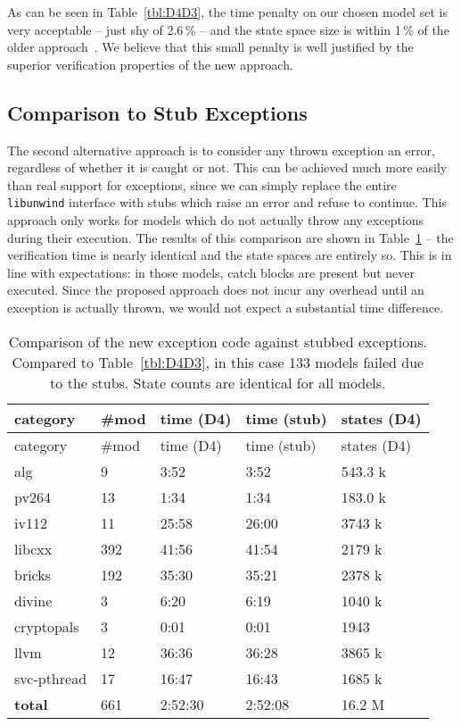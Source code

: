 As can be seen in Table~\ref{tbl:D4D3}, the time penalty on our chosen
model set is very acceptable -- just shy of 2.6\,\% -- and the state
space size is within 1\,\% of the older
approach~\cite{rockai16:model.checkin}. We believe that this small
penalty is well justified by the superior verification properties of the
new approach.

\subsection{Comparison to Stub
Exceptions}\label{comparison-to-stub-exceptions}

The second alternative approach is to consider any thrown exception an
error, regardless of whether it is caught or not. This can be achieved
much more easily than real support for exceptions, since we can simply
replace the entire \texttt{libunwind} interface with stubs which raise
an error and refuse to continue. This approach only works for models
which do not actually throw any exceptions during their execution. The
results of this comparison are shown in Table~\ref{tbl:D4stub} -- the
verification time is nearly identical and the state spaces are entirely
so. This is in line with expectations: in those models, catch blocks are
present but never executed. Since the proposed approach does not incur
any overhead until an exception is actually thrown, we would not expect
a substantial time difference.

\begin{table}[tp]
\caption{\label{tbl:D4stub}Comparison of the new exception code against
stubbed exceptions. Compared to Table~\ref{tbl:D4D3}, in this case 133
models failed due to the stubs. State counts are identical for all
models. }
\begin{tabularx}{\textwidth}{lllll}
\toprule
category & \#mod & time (D4) & time (stub) & states (D4)\tabularnewline
\midrule
\toprule
category & \#mod & time (D4) & time (stub) & states (D4)\tabularnewline
\midrule
alg & 9 & 3:52 & 3:52 & 543.3 k\tabularnewline
pv264 & 13 & 1:34 & 1:34 & 183.0 k\tabularnewline
iv112 & 11 & 25:58 & 26:00 & 3743 k\tabularnewline
libcxx & 392 & 41:56 & 41:54 & 2179 k\tabularnewline
bricks & 192 & 35:30 & 35:21 & 2378 k\tabularnewline
divine & 3 & 6:20 & 6:19 & 1040 k\tabularnewline
cryptopals & 3 & 0:01 & 0:01 & 1943\tabularnewline
llvm & 12 & 36:36 & 36:28 & 3865 k\tabularnewline
svc-pthread & 17 & 16:47 & 16:43 & 1685 k\tabularnewline
\textbf{total} & 661 & 2:52:30 & 2:52:08 & 16.2 M\tabularnewline
\bottomrule
\end{tabularx}
\end{table}

